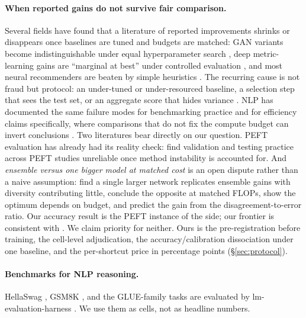 \documentclass[11pt]{article}
\begin{document}
\paragraph{When reported gains do not survive fair comparison.} Several fields have found that a literature of reported improvements shrinks or disappears once baselines are tuned and budgets are matched: GAN variants become indistinguishable under equal hyperparameter search \citep{lucic2018gans}, deep metric-learning gains are ``marginal at best'' under controlled evaluation \citep{musgrave2020metric}, and most neural recommenders are beaten by simple heuristics \citep{dacrema2019progress}. The recurring cause is not fraud but protocol: an under-tuned or under-resourced baseline, a selection step that sees the test set, or an aggregate score that hides variance \citep{dodge2019show, reimers2017reporting}. NLP has documented the same failure modes for benchmarking practice \citep{bowman2021will} and for efficiency claims specifically, where comparisons that do not fix the compute budget can invert conclusions \citep{dehghani2022efficiency}. Two literatures bear directly on our question. PEFT evaluation has already had its reality check: \citet{chen2022revisiting} find validation and testing practice across PEFT studies unreliable once method instability is accounted for. And \emph{ensemble versus one bigger model at matched cost} is an open dispute rather than a naive assumption: \citet{abe2022deep} find a single larger network replicates ensemble gains with diversity contributing little, \citet{kondratyuk2020ensembling} conclude the opposite at matched FLOPs, \citet{lobacheva2020power} show the optimum depends on budget, and \citet{theisen2023ensembles} predict the gain from the disagreement-to-error ratio. Our accuracy result is the PEFT instance of the \citeauthor{abe2022deep} side; our frontier is consistent with \citeauthor{theisen2023ensembles}. We claim priority for neither. Ours is the pre-registration before training, the cell-level adjudication, the accuracy/calibration dissociation under one baseline, and the per-shortcut price in percentage points (\S\ref{sec:protocol}).

\paragraph{Benchmarks for NLP reasoning.} HellaSwag \citep{zellers2019hellaswag}, GSM8K \citep{cobbe2021gsm8k}, and the GLUE-family tasks \citep{wang2018glue} are evaluated by lm-evaluation-harness \citep{gao2024lmeval}. We use them as cells, not as headline numbers.
\end{document}
